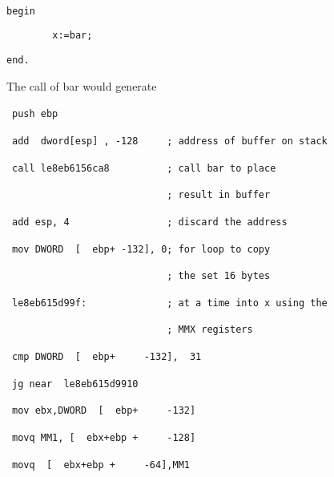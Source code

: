 {\texttt{~}

\texttt{begin}

\texttt{~~~~~~~~x:=bar;}

\texttt{end.}

The call of bar would generate

\begin{lyxcode}
~{\footnotesize }\texttt{\footnotesize push~ebp}{\footnotesize \par}

~\texttt{\footnotesize add~~dword{[}esp{]}~,~-128~~~~~;~address~of~buffer~on~stack}{\footnotesize \par}

~\texttt{\footnotesize call~le8eb6156ca8~~~~~~~~~~;~call~bar~to~place~}{\footnotesize \par}

~\texttt{\footnotesize ~~~~~~~~~~~~~~~~~~~~~~~~~~~;~result~in~buffer}{\footnotesize \par}

~\texttt{\footnotesize add~esp,~4~~~~~~~~~~~~~~~~~;~discard~the~address}{\footnotesize \par}

~\texttt{\footnotesize mov~DWORD~~{[}~~ebp+~-132{]},~0;~for~loop~to~copy~}{\footnotesize \par}

~\texttt{\footnotesize ~~~~~~~~~~~~~~~~~~~~~~~~~~~;~the~set~16~bytes}{\footnotesize \par}

~\texttt{\footnotesize le8eb615d99f:~~~~~~~~~~~~~~;~at~a~time~into~x~using~the~}{\footnotesize \par}

~\texttt{\footnotesize ~~~~~~~~~~~~~~~~~~~~~~~~~~~;~MMX~registers}{\footnotesize \par}

~\texttt{\footnotesize cmp~DWORD~~{[}~~ebp+~~~~~-132{]},~~31}{\footnotesize \par}

~\texttt{\footnotesize jg~near~~le8eb615d9910}{\footnotesize \par}

~\texttt{\footnotesize mov~ebx,DWORD~~{[}~~ebp+~~~~~-132{]}}{\footnotesize \par}

~\texttt{\footnotesize movq~MM1,~{[}~~ebx+ebp~+~~~~~-128{]}}{\footnotesize \par}

~\texttt{\footnotesize movq~~{[}~~ebx+ebp~+~~~~~-64{]},MM1}{\footnotesize \par}


\end{lyxcode}}

